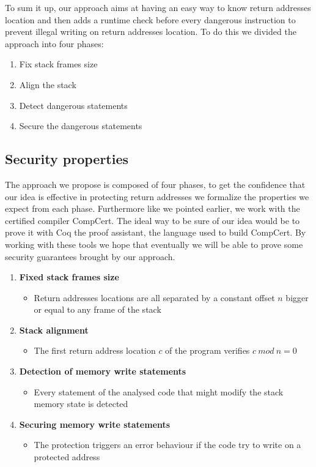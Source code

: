 \documentclass[11pt]{sdm}
\begin{document}
\hfill \break 
	To sum it up, our approach aims at having an easy way to know return addresses location and then adds a runtime check before every dangerous instruction to prevent illegal writing on return addresses location.
To do this we divided the approach into four phases:
\begin{enumerate}
	\item Fix stack frames size
	\item Align the stack
	\item Detect dangerous statements
	\item Secure the dangerous statements
\end{enumerate}


\subsection{Security properties}
\label{sub:Security properties}
	The approach we propose is composed of four phases, to get the confidence that our idea is effective in protecting return addresses we formalize the properties we expect from each phase. 
Furthermore like we pointed earlier, we work with the certified compiler CompCert.
The ideal way to be sure of our idea would be to prove it with Coq the proof assistant, the language used to build CompCert.
By working with these tools we hope that eventually we will be able to prove some security guarantees brought by our approach.

\begin{enumerate}
	\item \textbf{Fixed stack frames size}
		\begin{itemize}
			\item Return addresses locations are all separated by a constant offset $n$ bigger or equal to any frame of the stack
		\end{itemize}
	\item \textbf{Stack alignment}
		\begin{itemize}
			\item The first return address location $c$ of the program verifies $c~mod~n=0$
		\end{itemize}
	\item \textbf{Detection of memory write statements}
		\begin{itemize}
			\item Every statement of the analysed code that might modify the stack memory state is detected
		\end{itemize}
	\item \textbf{Securing memory write statements}
		\begin{itemize}
			\item The protection triggers an error behaviour if the code try to write on a protected address
		\end{itemize}
\end{enumerate}
\end{document}

